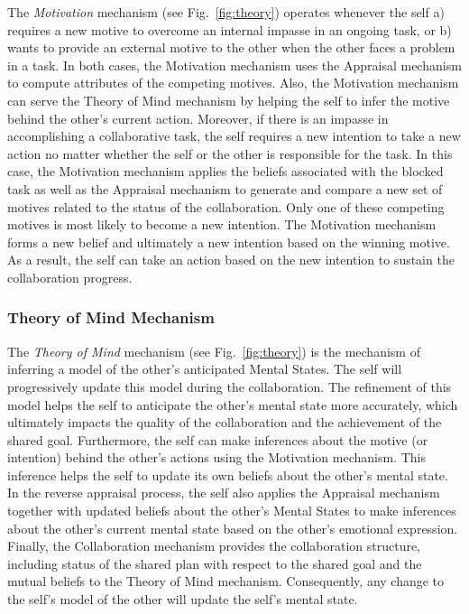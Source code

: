 The \textit{Motivation} mechanism (see Fig.~\ref{fig:theory}) operates whenever
the self a) requires a new motive to overcome an internal impasse in an ongoing
task, or b) wants to provide an external motive to the other when the other
faces a problem in a task. In both cases, the Motivation mechanism uses the
Appraisal mechanism to compute attributes of the competing motives. Also, the
Motivation mechanism can serve the Theory of Mind mechanism by helping the self
to infer the motive behind the other's current action. Moreover, if there is an
impasse in accomplishing a collaborative task, the self requires a new intention
to take a new action no matter whether the self or the other is responsible for
the task. In this case, the Motivation mechanism applies the beliefs associated
with the blocked task as well as the Appraisal mechanism to generate and compare
a new set of motives related to the status of the collaboration. Only one of
these competing motives is most likely to become a new intention. The Motivation
mechanism forms a new belief and ultimately a new intention based on the winning
motive. As a result, the self can take an action based on the new intention to
sustain the collaboration progress.

\subsubsection{Theory of Mind Mechanism}
\label{sec:tom-mech}

The \textit{Theory of Mind} mechanism (see Fig.~\ref{fig:theory}) is the
mechanism of inferring a model of the other's anticipated Mental States. The
self will progressively update this model during the collaboration. The
refinement of this model helps the self to anticipate the other's mental state
more accurately, which ultimately impacts the quality of the collaboration and
the achievement of the shared goal. Furthermore, the self can make inferences
about the motive (or intention) behind the other's actions using the Motivation
mechanism. This inference helps the self to update its own beliefs about the
other's mental state. In the reverse appraisal process, the self also applies
the Appraisal mechanism together with updated beliefs about the other's Mental
States to make inferences about the other's current mental state based on the
other's emotional expression. Finally, the Collaboration mechanism provides the
collaboration structure, including status of the shared plan with respect to the
shared goal and the mutual beliefs to the Theory of Mind mechanism.
Consequently, any change to the self's model of the other will update the self's
mental state.

